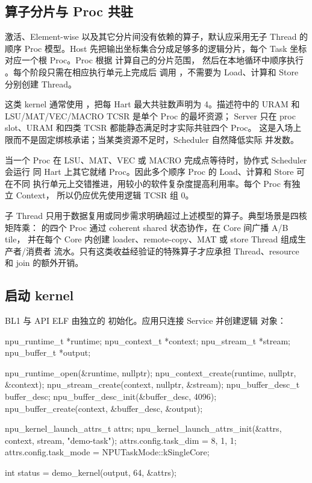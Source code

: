 \documentclass[../dayan_kernel_manual.tex]{subfiles}
\begin{document}
\subsection{算子分片与 Proc 共驻}

激活、Element-wise 以及其它分片间没有依赖的算子，默认应采用无子 Thread
的顺序 Proc 模型。Host 先把输出坐标集合分成足够多的逻辑分片，每个 Task
坐标对应一个根 Proc。Proc 根据  计算自己的分片范围，
然后在本地循环中顺序执行
。每个阶段只需在相应执行单元上完成后
调用 ，不需要为 Load、计算和 Store 分别创建 Thread。

这类 kernel 通常使用
，把每 Hart 最大共驻数声明为
4。描述符中的 URAM 和 LSU/MAT/VEC/MACRO TCSR 是单个 Proc 的最坏资源；
Server 只在 proc slot、URAM 和四类 TCSR 都能静态满足时才实际共驻四个 Proc。
这是入场上限而不是固定绑核承诺；当某类资源不足时，Scheduler 自然降低实际
并发数。

当一个 Proc 在 LSU、MAT、VEC 或 MACRO 完成点等待时，协作式 Scheduler 会运行
同 Hart 上其它就绪 Proc。因此多个顺序 Proc 的 Load、计算和 Store 可在不同
执行单元上交错推进，用较小的软件复杂度提高利用率。每个 Proc 有独立 Context，
所以仍应优先使用逻辑 TCSR 组 0。

子 Thread 只用于数据复用或同步需求明确超过上述模型的算子。典型场景是四核矩阵乘：
 的四个 Proc 通过 coherent shared 状态协作，在 Core 间广播 A/B tile，
并在每个 Core 内创建 loader、remote-copy、MAT 或 store Thread 组成生产者/消费者
流水。只有这类收益经验证的特殊算子才应承担 Thread、resource 和 join 的额外开销。

\subsection{启动 kernel}\label{sec:kernel-023}

BL1 与 API ELF 由独立的  初始化。应用只连接 Service 并创建逻辑
对象：

\begin{dayancode}
npu_runtime_t *runtime;
npu_context_t *context;
npu_stream_t *stream;
npu_buffer_t *output;

npu_runtime_open(&runtime, nullptr);
npu_context_create(runtime, nullptr, &context);
npu_stream_create(context, nullptr, &stream);
npu_buffer_desc_t buffer_desc;
npu_buffer_desc_init(&buffer_desc, 4096);
npu_buffer_create(context, &buffer_desc, &output);

npu_kernel_launch_attrs_t attrs;
npu_kernel_launch_attrs_init(&attrs, context, stream, "demo-task");
attrs.config.task_dim = {8, 1, 1};
attrs.config.task_mode = NPUTaskMode::kSingleCore;

int status = demo_kernel(output, 64, &attrs);
\end{dayancode}
\end{document}
